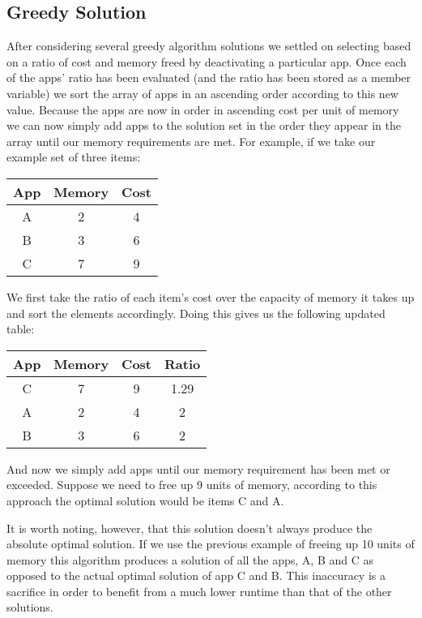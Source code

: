 \documentclass{article}
\begin{document}
\subsection{Greedy Solution}
After considering several greedy algorithm solutions we settled on selecting based on a ratio of cost and memory freed by deactivating a particular app. Once each of the apps’ ratio has been evaluated (and the ratio has been stored as a member variable) we sort the array of apps in an ascending order according to this new value. Because the apps are now in order in ascending cost per unit of memory we can now simply add apps to the solution set in the order they appear in the array until our memory requirements are met. For example, if we take our example set of three items:

\begin{center}
    \begin{tabular}{|c|c|c|}
        \hline
        App & Memory & Cost \\ \hline
        A & 2 & 4 \\
        B & 3 & 6 \\
        C & 7 & 9 \\
        \hline
    \end{tabular}
\end{center}

We first take the ratio of each item’s cost over the capacity of memory it takes up and sort the elements accordingly. Doing this gives us the following updated table:

\begin{center}
    \begin{tabular}{|c|c|c|c|}
        \hline
        App & Memory & Cost & Ratio \\ \hline
        C & 7 & 9 & 1.29 \\
        A & 2 & 4 & 2 \\
        B & 3 & 6 & 2 \\
        \hline
    \end{tabular}
\end{center}

And now we simply add apps until our memory requirement has been met or exceeded. Suppose we need to free up 9 units of memory, according to this approach the optimal solution would be items C and A.

It is worth noting, however, that this solution doesn’t always produce the absolute optimal solution. If we use the previous example of freeing up 10 units of memory this algorithm produces a solution of all the apps, A, B and C as opposed to the actual optimal solution of app C and B.  This inaccuracy is a sacrifice in order to benefit from a much lower runtime than that of the other solutions.
\end{document}
